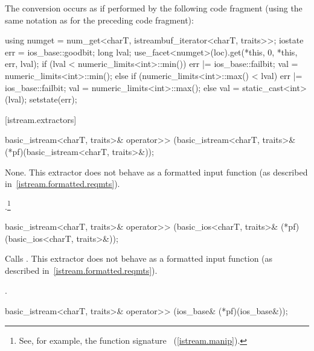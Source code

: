 \begin{itemdescr}
\pnum
The conversion occurs as if performed by the following code fragment
(using the same notation as for the preceding code fragment):
\begin{codeblock}
using numget = num_get<charT, istreambuf_iterator<charT, traits>>;
iostate err = ios_base::goodbit;
long lval;
use_facet<numget>(loc).get(*this, 0, *this, err, lval);
if (lval < numeric_limits<int>::min()) {
  err |= ios_base::failbit;
  val = numeric_limits<int>::min();
} else if (numeric_limits<int>::max() < lval) {
  err |= ios_base::failbit;
  val = numeric_limits<int>::max();
}  else
  val = static_cast<int>(lval);
setstate(err);
\end{codeblock}
\end{itemdescr}

[istream.extractors]{}

%
\begin{itemdecl}
basic_istream<charT, traits>& operator>>
    (basic_istream<charT, traits>& (*pf)(basic_istream<charT, traits>&));
\end{itemdecl}

\begin{itemdescr}
\pnum
\effects
None.
This extractor does not behave as a formatted input function
(as described in~\ref{istream.formatted.reqmts}).

\pnum
\returns
{}.\footnote{See, for example, the function signature
~(\ref{istream.manip}).%
}%
\end{itemdescr}

%
\begin{itemdecl}
basic_istream<charT, traits>& operator>>
    (basic_ios<charT, traits>& (*pf)(basic_ios<charT, traits>&));
\end{itemdecl}

\begin{itemdescr}
\pnum
\effects
Calls
.
This extractor does not behave as a formatted input function
(as described in~\ref{istream.formatted.reqmts}).

\pnum
\returns
{}.
\end{itemdescr}

%
\begin{itemdecl}
basic_istream<charT, traits>& operator>>
    (ios_base& (*pf)(ios_base&));
\end{itemdecl}

